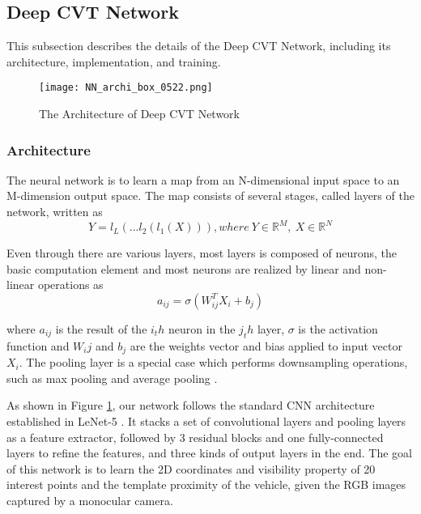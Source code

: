 \subsection{Deep CVT Network}
\label{network}
This subsection describes the details of the Deep CVT Network, including its architecture, implementation, and training.

\begin{figure}[h]		
	\texttt{[image: NN\_archi\_box\_0522.png]}
	\caption{The Architecture of Deep CVT Network}
	\centering
	\label{figure:nn_archi}
\end{figure}

\subsubsection{Architecture}
The neural network is to learn a map from an N-dimensional  input space to an M-dimension output space. The map consists of several stages, called layers of the network, written as
\begin{equation}
Y = l_L(...l_2(l_1(X))), where ~Y \in {\mathbb{R}^M}, ~X \in {\mathbb{R}^N}
\end{equation}

Even through there are various layers, most layers  is composed of neurons, the basic computation element and most neurons are realized by linear and non-linear operations as 
\begin{equation}
a_{ij} = \sigma(W_{ij}^T X_i +b_j)
\end{equation}

where $a_{ij}$ is the result of the $i_th$ neuron in the $j_th$ layer, $\sigma$ is the activation function and $W_ij$ and $b_j$ are the weights vector and bias applied to input vector $X_i$.  The pooling layer is a special case which performs downsampling operations, such as max pooling \cite{Boureau:2010} and average pooling \cite{6460871}.

As shown in Figure \ref{figure:nn_archi}, our network follows the standard CNN architecture established in LeNet-5 \cite{726791}. It stacks a set of convolutional layers and pooling layers as a feature extractor, \tbd followed by 3 residual blocks and one fully-connected layers to refine the features, and three kinds of output layers in the end. The goal of this network is to learn the 2D coordinates and visibility property of 20 interest points and the template proximity of the vehicle, given the RGB images captured by a monocular camera.

